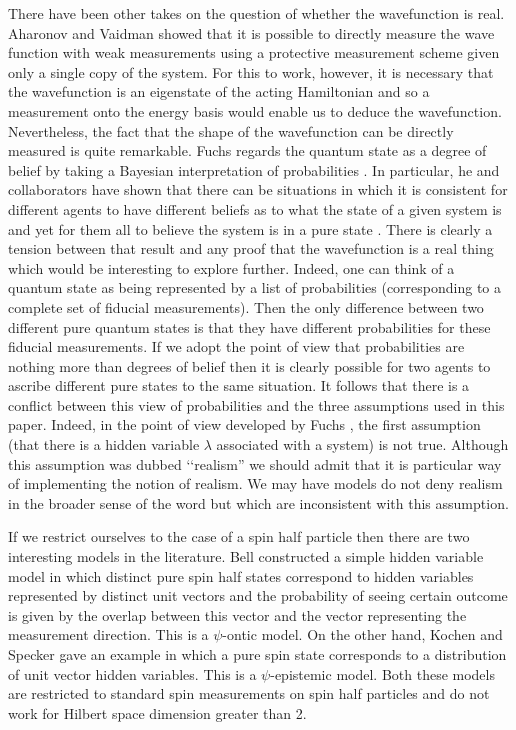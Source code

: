 \documentclass[12pt]{article}
\begin{document}
There have been other takes on the question of whether the wavefunction is real.   Aharonov and Vaidman \cite{aharonov1993measurement} showed that it is possible to directly measure the wave
function with weak measurements using a protective measurement scheme given only a single copy of the system.  For this to work, however, it is necessary that the wavefunction is an
eigenstate of the acting Hamiltonian and so a measurement onto the energy basis would enable us to deduce the wavefunction. Nevertheless, the fact that the shape of the wavefunction can be
directly measured is quite remarkable.  Fuchs regards the quantum state as a degree of belief by taking a Bayesian interpretation of probabilities \cite{fuchs2010qbism}.  In particular, he
and collaborators have shown that there can be situations in which it is consistent for different agents to have different beliefs as to what the state of a given system is and yet for them
all to believe the system is in a pure state \cite{caves2002conditions}.  There is clearly a tension between that result and any proof that the wavefunction is a real thing which would be
interesting to explore further.  Indeed, one can think of a quantum state as being represented by a list of probabilities (corresponding to a complete set of fiducial measurements).  Then the only difference between two different pure quantum states is that they have different probabilities for these fiducial measurements.  If we adopt the point of view that probabilities are nothing more than degrees of belief then it is clearly possible for two agents to ascribe different pure states to the same situation.  It follows that there is a conflict between this view of probabilities and the three assumptions used in this paper.  Indeed, in the point of view developed by Fuchs \cite{fuchs2010qbism}, the first assumption (that there is a hidden variable $\lambda$ associated with a system) is not true.   Although this assumption was dubbed \lq\lq realism'' we should admit that it is particular way of implementing the notion of realism.  We may have models do not deny realism in the broader sense of the word but which are inconsistent with this assumption.

If we restrict ourselves to the case of a spin half particle then there are two interesting models in the literature. Bell \cite{bell1964on} constructed a simple hidden variable model in
which distinct pure spin half states correspond to hidden variables represented by distinct unit vectors and the probability of seeing certain outcome is given by the overlap between this
vector and the vector representing the measurement direction.  This is a $\psi$-ontic model.  On the other hand, Kochen and Specker \cite{kochen1967problem} gave an example in which a pure
spin state corresponds to a distribution of unit vector hidden variables. This is a $\psi$-epistemic model.  Both these models are restricted to standard spin measurements on spin half
particles and do not work for Hilbert space dimension greater than 2.
\end{document}
